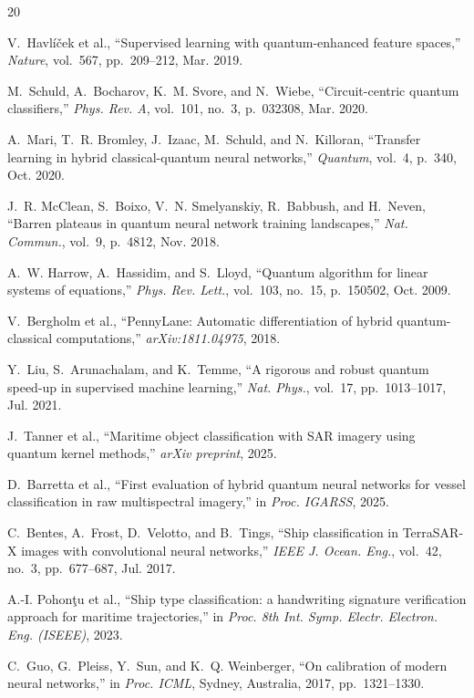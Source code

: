 \documentclass[journal]{IEEEtran}
\begin{document}

\begin{thebibliography}{20}

V.~Havl{\'i}{\v{c}}ek et al., ``Supervised learning with quantum-enhanced feature spaces,'' \textit{Nature}, vol.~567, pp.~209--212, Mar. 2019.

M.~Schuld, A.~Bocharov, K.~M. Svore, and N.~Wiebe, ``Circuit-centric quantum classifiers,'' \textit{Phys. Rev. A}, vol.~101, no.~3, p.~032308, Mar. 2020.

A.~Mari, T.~R. Bromley, J.~Izaac, M.~Schuld, and N.~Killoran, ``Transfer learning in hybrid classical-quantum neural networks,'' \textit{Quantum}, vol.~4, p.~340, Oct. 2020.

J.~R. McClean, S.~Boixo, V.~N. Smelyanskiy, R.~Babbush, and H.~Neven, ``Barren plateaus in quantum neural network training landscapes,'' \textit{Nat. Commun.}, vol.~9, p.~4812, Nov. 2018.

A.~W. Harrow, A.~Hassidim, and S.~Lloyd, ``Quantum algorithm for linear systems of equations,'' \textit{Phys. Rev. Lett.}, vol.~103, no.~15, p.~150502, Oct. 2009.

V.~Bergholm et al., ``PennyLane: Automatic differentiation of hybrid quantum-classical computations,'' \textit{arXiv:1811.04975}, 2018.

Y.~Liu, S.~Arunachalam, and K.~Temme, ``A rigorous and robust quantum speed-up in supervised machine learning,'' \textit{Nat. Phys.}, vol.~17, pp.~1013--1017, Jul. 2021.

J.~Tanner et al., ``Maritime object classification with SAR imagery using quantum kernel methods,'' \textit{arXiv preprint}, 2025.

D.~Barretta et al., ``First evaluation of hybrid quantum neural networks for vessel classification in raw multispectral imagery,'' in \textit{Proc. IGARSS}, 2025.

C.~Bentes, A.~Frost, D.~Velotto, and B.~Tings, ``Ship classification in TerraSAR-X images with convolutional neural networks,'' \textit{IEEE J. Ocean. Eng.}, vol.~42, no.~3, pp.~677--687, Jul. 2017.

A.-I. Pohon\c{t}u et al., ``Ship type classification: a handwriting signature verification approach for maritime trajectories,'' in \textit{Proc. 8th Int. Symp. Electr. Electron. Eng. (ISEEE)}, 2023.

C.~Guo, G.~Pleiss, Y.~Sun, and K.~Q. Weinberger, ``On calibration of modern neural networks,'' in \textit{Proc. ICML}, Sydney, Australia, 2017, pp.~1321--1330.

\end{thebibliography}
\end{document}

